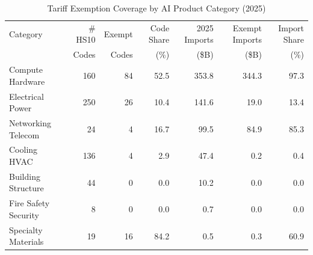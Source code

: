\begin{table}[htbp]
\centering
\caption{Tariff Exemption Coverage by AI Product Category (2025)}
\label{tab:exemption_by_category}
\setlength{\tabcolsep}{3mm}
\renewcommand{\arraystretch}{1.60}
\begin{tabular}{lrrrrrr}
\toprule
Category & \# HS10 & Exempt & Code Share & 2025 Imports & Exempt Imports & Import Share \\
 & Codes & Codes & (\%) & (\$B) & (\$B) & (\%) \\
\midrule
Compute Hardware & 160 & 84 & 52.5 & 353.8 & 344.3 & 97.3 \\
Electrical Power & 250 & 26 & 10.4 & 141.6 & 19.0 & 13.4 \\
Networking Telecom & 24 & 4 & 16.7 & 99.5 & 84.9 & 85.3 \\
Cooling HVAC & 136 & 4 & 2.9 & 47.4 & 0.2 & 0.4 \\
Building Structure & 44 & 0 & 0.0 & 10.2 & 0.0 & 0.0 \\
Fire Safety Security & 8 & 0 & 0.0 & 0.7 & 0.0 & 0.0 \\
Specialty Materials & 19 & 16 & 84.2 & 0.5 & 0.3 & 60.9 \\
\bottomrule
\end{tabular}
\end{table}
